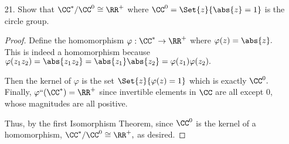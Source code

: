 \documentclass{article}
\begin{document}
\begin{itemize}
\begin{soln}
		\end{soln}

	\item[21.] Show that $\CC^*/\CC^0\cong \RR^+$ where $\CC^0=\Set{z}{\abs{z}=1}$ is the circle group.
		\begin{proof}
			Define the homomorphism $\varphi:\CC^*\to\RR^+$ where $\varphi(z)=\abs{z}.$ This is indeed a homomorphism because $\varphi(z_1z_2)=\abs{z_1z_2}=\abs{z_1}\abs{z_2}=\varphi(z_1)\varphi(z_2).$ 
			
			Then the kernel of $\varphi$ is the set $\Set{z}{\varphi(z)=1}$ which is exactly $\CC^0.$ Finally, $\varphi``(\CC^*)=\RR^+$ since invertible elements in $\CC$ are all except 0, whose magnitudes are all positive. 

			Thus, by the first Isomorphism Theorem, since $\CC^0$ is the kernel of a homomorphism, $\CC^*/\CC^0\cong \RR^+,$ as desired.
			
		\end{proof}
		
\end{itemize}
\end{document}
